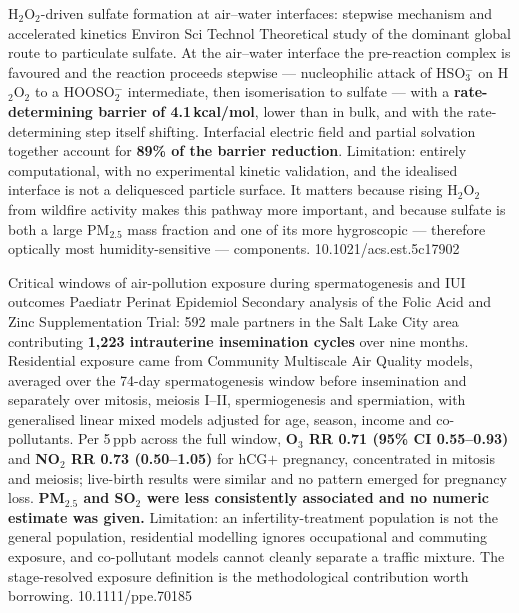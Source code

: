 \documentclass[10pt]{article}
\begin{document}
{H$_2$O$_2$-driven sulfate formation at air--water interfaces: stepwise mechanism and
accelerated kinetics}
{Environ Sci Technol}
{Theoretical study of the dominant global route to particulate sulfate. At the air--water
interface the pre-reaction complex is favoured and the reaction proceeds stepwise ---
nucleophilic attack of HSO$_3^-$ on H$_2$O$_2$ to a HOOSO$_2^-$ intermediate, then
isomerisation to sulfate --- with a \textbf{rate-determining barrier of 4.1\,kcal/mol},
lower than in bulk, and with the rate-determining step itself shifting. Interfacial
electric field and partial solvation together account for \textbf{89\% of the barrier
reduction}. Limitation: entirely computational, with no experimental kinetic validation,
and the idealised interface is not a deliquesced particle surface. It matters because
rising H$_2$O$_2$ from wildfire activity makes this pathway more important, and because
sulfate is both a large PM$_{2.5}$ mass fraction and one of its more hygroscopic ---
therefore optically most humidity-sensitive --- components.}
{10.1021/acs.est.5c17902}


{Critical windows of air-pollution exposure during spermatogenesis and IUI outcomes}
{Paediatr Perinat Epidemiol}
{Secondary analysis of the Folic Acid and Zinc Supplementation Trial: 592 male partners
in the Salt Lake City area contributing \textbf{1{,}223 intrauterine insemination cycles}
over nine months. Residential exposure came from Community Multiscale Air Quality models,
averaged over the 74-day spermatogenesis window before insemination and separately over
mitosis, meiosis I--II, spermiogenesis and spermiation, with generalised linear mixed
models adjusted for age, season, income and co-pollutants. Per 5\,ppb across the full
window, \textbf{O$_3$ RR 0.71 (95\% CI 0.55--0.93)} and \textbf{NO$_2$ RR 0.73
(0.50--1.05)} for hCG$+$ pregnancy, concentrated in mitosis and meiosis; live-birth
results were similar and no pattern emerged for pregnancy loss. \textbf{PM$_{2.5}$ and
SO$_2$ were less consistently associated and no numeric estimate was given.} Limitation:
an infertility-treatment population is not the general population, residential modelling
ignores occupational and commuting exposure, and co-pollutant models cannot cleanly
separate a traffic mixture. The stage-resolved exposure definition is the methodological
contribution worth borrowing.}
{10.1111/ppe.70185}
\end{document}
